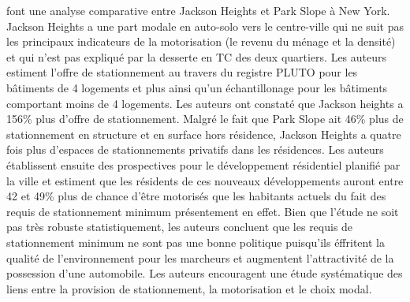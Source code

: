 \textcite{Weinberger:ResidentialOffStreet:2009} font une analyse comparative entre Jackson Heights et Park Slope à New York. Jackson Heights a une part modale en auto-solo vers le centre-ville qui ne suit pas les principaux indicateurs de la motorisation (le revenu du ménage et la densité) et qui n'est pas expliqué par la desserte en \ac{TC} des deux quartiers. Les auteurs estiment l'offre de stationnement au travers du registre \ac{PLUTO} pour les bâtiments de 4 logements et plus ainsi qu'un échantillonage pour les bâtiments comportant moins de 4 logements. Les auteurs ont constaté que Jackson heights a 156\% plus d'offre de stationnement. Malgré le fait que Park Slope ait 46\% plus de stationnement en structure et en surface hors résidence, Jackson Heights a quatre fois plus d'espaces de stationnements privatifs dans les résidences. Les auteurs établissent ensuite des prospectives pour le développement résidentiel planifié par la ville et estiment que les résidents de ces nouveaux développements auront entre 42 et 49\% plus de chance d'être motorisés que les habitants actuels du fait des requis de stationnement minimum présentement en effet. Bien que l'étude ne soit pas très robuste statistiquement, les auteurs concluent que les requis de stationnement minimum ne sont pas une bonne politique puisqu'ils éffritent la qualité de l'environnement pour les marcheurs et augmentent l'attractivité de la possession d'une automobile. Les auteurs encouragent une étude systématique des liens entre la provision de stationnement, la motorisation et le choix modal.\par

